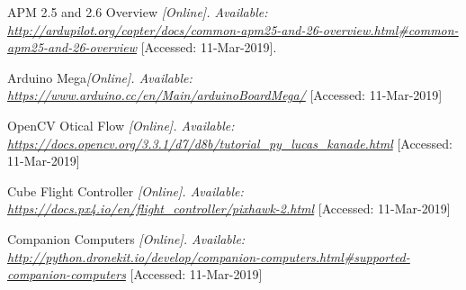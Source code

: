\documentclass[conference,12pt, ]{IEEEtran}
\begin{document}
\clearpage
  \begin{thebibliography}{999}

    APM 2.5 and 2.6 Overview  {\em [Online]. Available: \url{http://ardupilot.org/copter/docs/common-apm25-and-26-overview.html#common-apm25-and-26-overview}} [Accessed: 11-Mar-2019].

   Arduino Mega{\em [Online]. Available: \url{https://www.arduino.cc/en/Main/arduinoBoardMega/}} [Accessed: 11-Mar-2019]

   OpenCV Otical Flow {\em [Online]. Available: \url{https://docs.opencv.org/3.3.1/d7/d8b/tutorial_py_lucas_kanade.html}} [Accessed: 11-Mar-2019]

 Cube Flight Controller {\em [Online]. Available: \url{https://docs.px4.io/en/flight_controller/pixhawk-2.html}} [Accessed: 11-Mar-2019]

 Companion Computers {\em [Online]. Available: \url{http://python.dronekit.io/develop/companion-computers.html#supported-companion-computers}} [Accessed: 11-Mar-2019]

  \end{thebibliography}
\end{document}

